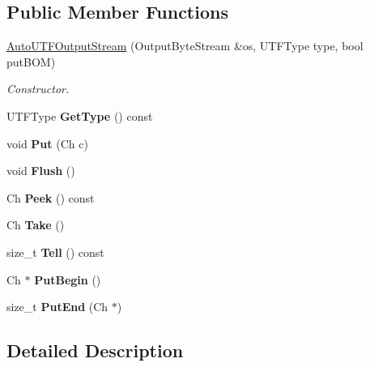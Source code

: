 \subsection*{Public Member Functions}
\begin{DoxyCompactItemize}
\item 
\hyperlink{a00042_a2fe7dbc8e43d11295f66df5653148137}{Auto\+U\+T\+F\+Output\+Stream} (Output\+Byte\+Stream \&os, U\+T\+F\+Type type, bool put\+B\+OM)
\begin{DoxyCompactList}\small\item\em Constructor. \end{DoxyCompactList}\item 
U\+T\+F\+Type {\bfseries Get\+Type} () const \hypertarget{a00042_ac0b150bc3a52534c0e076a02c7708de3}{}\label{a00042_ac0b150bc3a52534c0e076a02c7708de3}

\item 
void {\bfseries Put} (Ch c)\hypertarget{a00042_ad12b33e48c45bdbf2628fd3d5461041a}{}\label{a00042_ad12b33e48c45bdbf2628fd3d5461041a}

\item 
void {\bfseries Flush} ()\hypertarget{a00042_a38b54c84ba0c479552256ac092529f47}{}\label{a00042_a38b54c84ba0c479552256ac092529f47}

\item 
Ch {\bfseries Peek} () const \hypertarget{a00042_ae94659ad6b20e4a89d59a8c98ea6b580}{}\label{a00042_ae94659ad6b20e4a89d59a8c98ea6b580}

\item 
Ch {\bfseries Take} ()\hypertarget{a00042_a44ee7d84ba13fece17574d01b7be574b}{}\label{a00042_a44ee7d84ba13fece17574d01b7be574b}

\item 
size\+\_\+t {\bfseries Tell} () const \hypertarget{a00042_a63ab76ef57db6ab2c2899173e916a6a9}{}\label{a00042_a63ab76ef57db6ab2c2899173e916a6a9}

\item 
Ch $\ast$ {\bfseries Put\+Begin} ()\hypertarget{a00042_a3c7333661dba3d2210f0b287bdd6c1f3}{}\label{a00042_a3c7333661dba3d2210f0b287bdd6c1f3}

\item 
size\+\_\+t {\bfseries Put\+End} (Ch $\ast$)\hypertarget{a00042_a4b16bda191526c894501fce447e95b8d}{}\label{a00042_a4b16bda191526c894501fce447e95b8d}

\end{DoxyCompactItemize}


\subsection{Detailed Description}
